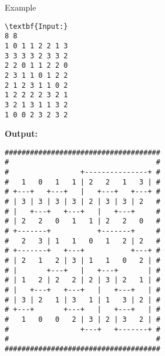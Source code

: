 Example
\begin{verbatim}
\textbf{Input:}
8 8
1 0 1 1 2 2 1 3
3 3 3 3 2 3 3 2
2 2 0 1 1 2 2 0
2 3 1 1 0 1 2 2
2 1 2 3 1 1 0 2
1 2 2 2 2 3 2 1
3 2 1 3 1 1 3 2
1 0 0 2 3 2 3 2\end{verbatim}

\textbf{Output:}
\begin{verbatim}
#####################################
#                                   #
#                 +---------------+ #
#   1   0   1   1 | 2   2   1   3 | #
# +---+   +---+   |   +---+   +---+ #
# | 3 | 3 | 3 | 3 | 2 | 3 | 3 | 2   #
# |   +---+   +---+   |   +---+     #
# | 2   2   0   1   1 | 2   2   0   #
# +-------+           +-------+     #
#   2   3 | 1   1   0   1   2 | 2   #
# +-------+   +---+           +---+ #
# | 2   1   2 | 3 | 1   1   0   2 | #
# |       +---+   |   +---+       | #
# | 1   2 | 2   2 | 2 | 3 | 2   1 | #
# |   +---+   +---+   |   +---+   | #
# | 3 | 2   1 | 3   1 | 1   3 | 2 | #
# +---+       +---+   |   +---+   | #
#   1   0   0   2 | 3 | 2 | 3   2 | #
#                 +---+   +-------+ #
#                                   #
#####################################
\end{verbatim}